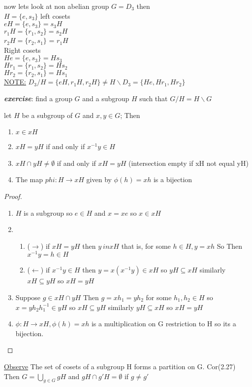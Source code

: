 \documentclass{article}
\begin{document}
 
 now lets look at non abelian group $G = D_3$ then \\ $H = \{e, s_3\}$ 
left cosets\\  $eH = \{e, s_3\} = s_3H$ \\ 
$r_1H = \{r_1, s_2 \} = s_2H  $\\ 
$r_2H = \{r_2, s_1 \}$ = $r_1H$ \\

Right cosets \\ 
$He = \{e, s_3\} = Hs_3$ \\ 
$Hr_1 = \{r_1, s_2 \} = Hs_2$ \\
$Hr_2 = \{r_2, s_1 \} = Hs_1$ \\
\underline{NOTE:} $D_3/H = \{eH, r_1H, r_2H \} \neq H \backslash D_3 = \{He, Hr_1, Hr_2 \}$ 

 \textbf{\textit{exercise}}: find a group $G$ and a subgroup $H$ such that $G / H = H \backslash G$

 \begin{lemma}[2.2.6]
    let $H$ be a subgroup of $G$ and $x,y \in G$; Then \begin{enumerate}
        \item $x \in xH$ 
        \item $xH = yH$ if and only if $x^{-1}y \in H$
        \item $xH \cap yH \neq \emptyset$ if and only if $xH = yH$ (intersection empty if xH not equal yH)
        \item The map $phi: H \rightarrow xH $ given by $\phi(h) = xh$ is a bijection
    \end{enumerate}
    \begin{proof} \leavevmode
        \begin{enumerate}
            \item $H$ is a subgroup so $e \in H$ and $x = xe$ so $x \in xH$ 
            \item \begin{enumerate}
                \item ($\rightarrow$) if $xH = yH$ then $ y\ in xH$ that is, for some $h \in H, y = xh$ So Then $x^{-1}y = h \in H$
                \item ($\leftarrow$) if $x^{-1}y \in H$ then $y = x(x^{-1}y) \in xH$ so $yH \subseteq xH$ similarly $xH \subseteq yH$ so $xH = yH$
            \end{enumerate}
            \item Suppose $g \in xH \cap yH$ Then $g = xh_1 = yh_2$ for some $h_1, h_2 \in H$ so $x = yh_2h_1^{-1} \in yH$ so $xH \subseteq yH$ similarly $yH \subseteq xH$ so $xH = yH$
            \item $\phi: H \rightarrow xH, \phi(h) = xh$ is a multiplication on G restriction to H so its a bijection. 
        \end{enumerate}
    \end{proof}
 \end{lemma}
 \underline{Observe} The set of cosets of a subgroup H forms a partition on G. Cor(2.27) Then $G = \bigcup_{g \in G} gH$ and $gH \cap g'H = \emptyset$ if $g \neq g'$
\end{document}
